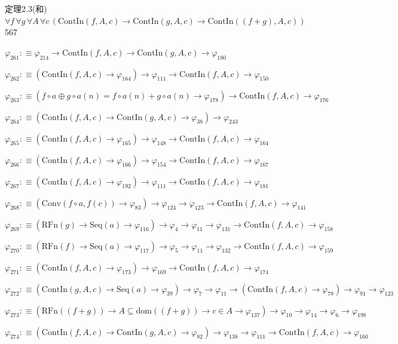 \begin{fullproof}{定理2.3(和)}{$\forall f\,\forall g\,\forall A\,\forall c\,(\mathrm{ContIn}(f,A,c) \to \mathrm{ContIn}(g,A,c) \to \mathrm{ContIn}((f + g),A,c))$}{567}
\begin{abbrevlist}
\item $\varphi_{261} :\equiv \varphi_{214} \to \mathrm{ContIn}(f,A,c) \to \mathrm{ContIn}(g,A,c) \to \varphi_{180}$
\item $\varphi_{262} :\equiv (\mathrm{ContIn}(f,A,c) \to \varphi_{164}) \to \varphi_{111} \to \mathrm{ContIn}(f,A,c) \to \varphi_{150}$
\item $\varphi_{263} :\equiv (f \circ a \oplus g \circ a(n) = f \circ a(n) + g \circ a(n) \to \varphi_{178}) \to \mathrm{ContIn}(f,A,c) \to \varphi_{176}$
\item $\varphi_{264} :\equiv (\mathrm{ContIn}(f,A,c) \to \mathrm{ContIn}(g,A,c) \to \varphi_{38}) \to \varphi_{243}$
\item $\varphi_{265} :\equiv (\mathrm{ContIn}(f,A,c) \to \varphi_{165}) \to \varphi_{148} \to \mathrm{ContIn}(f,A,c) \to \varphi_{164}$
\item $\varphi_{266} :\equiv (\mathrm{ContIn}(f,A,c) \to \varphi_{166}) \to \varphi_{154} \to \mathrm{ContIn}(f,A,c) \to \varphi_{167}$
\item $\varphi_{267} :\equiv (\mathrm{ContIn}(f,A,c) \to \varphi_{192}) \to \varphi_{111} \to \mathrm{ContIn}(f,A,c) \to \varphi_{181}$
\item $\varphi_{268} :\equiv (\mathrm{Conv}(f \circ a,f(c)) \to \varphi_{83}) \to \varphi_{124} \to \varphi_{123} \to \mathrm{ContIn}(f,A,c) \to \varphi_{141}$
\item $\varphi_{269} :\equiv (\mathrm{RFn}(g) \to \mathrm{Seq}(a) \to \varphi_{116}) \to \varphi_{4} \to \varphi_{11} \to \varphi_{131} \to \mathrm{ContIn}(f,A,c) \to \varphi_{158}$
\item $\varphi_{270} :\equiv (\mathrm{RFn}(f) \to \mathrm{Seq}(a) \to \varphi_{117}) \to \varphi_{5} \to \varphi_{11} \to \varphi_{132} \to \mathrm{ContIn}(f,A,c) \to \varphi_{159}$
\item $\varphi_{271} :\equiv (\mathrm{ContIn}(f,A,c) \to \varphi_{173}) \to \varphi_{169} \to \mathrm{ContIn}(f,A,c) \to \varphi_{174}$
\item $\varphi_{272} :\equiv (\mathrm{ContIn}(g,A,c) \to \mathrm{Seq}(a) \to \varphi_{39}) \to \varphi_{7} \to \varphi_{11} \to (\mathrm{ContIn}(f,A,c) \to \varphi_{78}) \to \varphi_{91} \to \varphi_{123}$
\item $\varphi_{273} :\equiv (\mathrm{RFn}((f + g)) \to A \subseteq \mathrm{dom}((f + g)) \to c \in A \to \varphi_{137}) \to \varphi_{10} \to \varphi_{14} \to \varphi_{6} \to \varphi_{198}$
\item $\varphi_{274} :\equiv (\mathrm{ContIn}(f,A,c) \to \mathrm{ContIn}(g,A,c) \to \varphi_{82}) \to \varphi_{138} \to \varphi_{111} \to \mathrm{ContIn}(f,A,c) \to \varphi_{160}$

\end{abbrevlist}
\end{fullproof}
